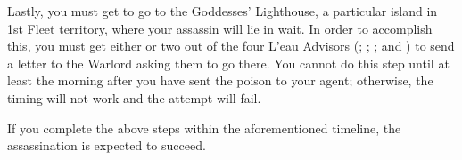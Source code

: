 \documentclass[green]{GL2020}
\begin{document}
Lastly, you must get \cLoud{} to go to the Goddesses’ Lighthouse, a particular island in 1st Fleet territory, where your assassin will lie in wait. In order to accomplish this, you must get either \cWarlordDaughter{} or two out of the four L’eau Advisors (\cChupLeader{\full}; \cJuniorStatesman{\full}; \cBunker{\full}; and \cEbbPriest{\full}) to send a letter to the Warlord asking them to go there. You cannot do this step until at least the morning after you have sent the poison to your agent; otherwise, the timing will not work and the attempt will fail. 

If you complete the above steps within the aforementioned timeline, the assassination is expected to succeed.
\end{document}
